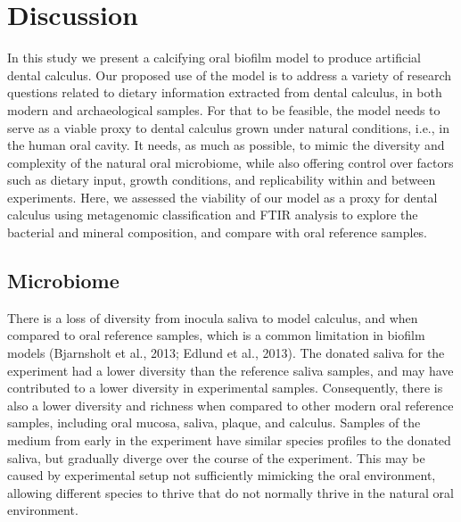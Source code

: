 \documentclass[
]{article}
\begin{document}
\hypertarget{discussion}{%
\section{Discussion}\label{discussion}}

In this study we present a calcifying oral biofilm model to produce
artificial dental calculus. Our proposed use of the model is to address
a variety of research questions related to dietary information extracted
from dental calculus, in both modern and archaeological samples. For
that to be feasible, the model needs to serve as a viable proxy to
dental calculus grown under natural conditions, i.e., in the human oral
cavity. It needs, as much as possible, to mimic the diversity and
complexity of the natural oral microbiome, while also offering control
over factors such as dietary input, growth conditions, and replicability
within and between experiments. Here, we assessed the viability of our
model as a proxy for dental calculus using metagenomic classification
and FTIR analysis to explore the bacterial and mineral composition, and
compare with oral reference samples.

\hypertarget{microbiome}{%
\subsection{Microbiome}\label{microbiome}}

There is a loss of diversity from inocula saliva to model calculus, and
when compared to oral reference samples, which is a common limitation in
biofilm models (Bjarnsholt et al., 2013; Edlund et al., 2013). The
donated saliva for the experiment had a lower diversity than the
reference saliva samples, and may have contributed to a lower diversity
in experimental samples. Consequently, there is also a lower diversity
and richness when compared to other modern oral reference samples,
including oral mucosa, saliva, plaque, and calculus. Samples of the
medium from early in the experiment have similar species profiles to the
donated saliva, but gradually diverge over the course of the experiment.
This may be caused by experimental setup not sufficiently mimicking the
oral environment, allowing different species to thrive that do not
normally thrive in the natural oral environment.
\end{document}
